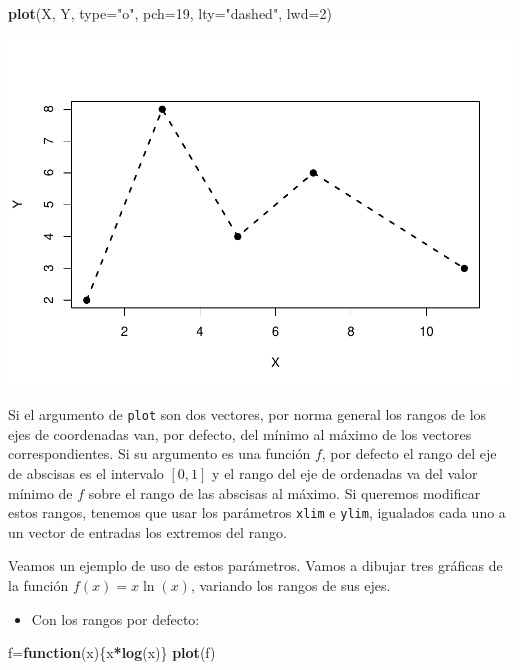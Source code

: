 \documentclass[
]{book}
\newenvironment{Shaded}{\begin{snugshade}}{\end{snugshade}}
\newcommand{\ControlFlowTok}[1]{\textcolor[rgb]{0.13,0.29,0.53}{\textbf{#1}}}
\newcommand{\DataTypeTok}[1]{\textcolor[rgb]{0.13,0.29,0.53}{#1}}
\newcommand{\DecValTok}[1]{\textcolor[rgb]{0.00,0.00,0.81}{#1}}
\newcommand{\KeywordTok}[1]{\textcolor[rgb]{0.13,0.29,0.53}{\textbf{#1}}}
\newcommand{\NormalTok}[1]{#1}
\newcommand{\OperatorTok}[1]{\textcolor[rgb]{0.81,0.36,0.00}{\textbf{#1}}}
\newcommand{\StringTok}[1]{\textcolor[rgb]{0.31,0.60,0.02}{#1}}
\providecommand{\tightlist}{%
  \setlength{\itemsep}{0pt}\setlength{\parskip}{0pt}}
\theoremstyle{definition}
\theoremstyle{definition}
\theoremstyle{definition}
\theoremstyle{remark}
\begin{document}
\begin{Shaded}
\begin{Highlighting}[]
\KeywordTok{plot}\NormalTok{(X, Y, }\DataTypeTok{type=}\StringTok{"o"}\NormalTok{, }\DataTypeTok{pch=}\DecValTok{19}\NormalTok{, }\DataTypeTok{lty=}\StringTok{"dashed"}\NormalTok{, }\DataTypeTok{lwd=}\DecValTok{2}\NormalTok{)}
\end{Highlighting}
\end{Shaded}

\begin{center}\includegraphics[width=0.9\linewidth]{07chap06_Graficos_I_files/figure-latex/unnamed-chunk-13-1} \end{center}

Si el argumento de \texttt{plot} son dos vectores, por norma general los rangos de los ejes de coordenadas van, por defecto, del mínimo al máximo de los vectores correspondientes. Si su argumento es una función \(f\), por defecto el rango del eje de abscisas es el intervalo \([0, 1]\) y el rango del eje de ordenadas va del valor mínimo de \(f\) sobre el rango de las abscisas al máximo. Si queremos modificar estos rangos, tenemos que usar los parámetros \texttt{xlim} e \texttt{ylim}, igualados cada uno a un vector de entradas los extremos del rango.

Veamos un ejemplo de uso de estos parámetros. Vamos a dibujar tres gráficas de la función \(f(x)=x\ln(x)\), variando los rangos de sus ejes.

\begin{itemize}
\tightlist
\item
  Con los rangos por defecto:
\end{itemize}

\begin{Shaded}
\begin{Highlighting}[]
\NormalTok{f=}\ControlFlowTok{function}\NormalTok{(x)\{x}\OperatorTok{*}\KeywordTok{log}\NormalTok{(x)\}}
\KeywordTok{plot}\NormalTok{(f)    }
\end{Highlighting}
\end{Shaded}
\end{document}
